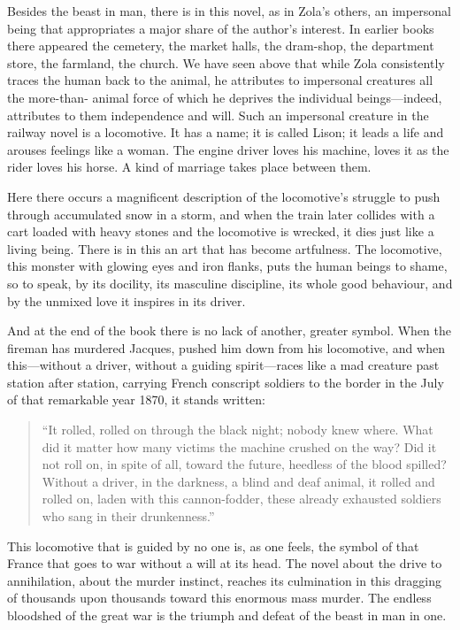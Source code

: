 \documentclass[12pt,a4paper]{article}
\begin{document}
Besides the beast in man, there is in this novel, as in Zola's others,
an impersonal being that appropriates a major share of the author's
interest. In earlier books there appeared the cemetery, the market
halls, the dram-shop, the department store, the farmland, the church.
We have seen above that while Zola consistently traces the human back
to the animal, he attributes to impersonal creatures all the more-than-
animal force of which he deprives the individual beings---indeed,
attributes to them independence and will. Such an impersonal creature
in the railway novel is a locomotive. It has a name; it is called
Lison; it leads a life and arouses feelings like a woman. The engine
driver loves his machine, loves it as the rider loves his horse. A
kind of marriage takes place between them.

Here there occurs a magnificent description of the locomotive's
struggle to push through accumulated snow in a storm, and when the
train later collides with a cart loaded with heavy stones and the
locomotive is wrecked, it dies just like a living being. There is in
this an art that has become artfulness. The locomotive, this monster
with glowing eyes and iron flanks, puts the human beings to shame, so
to speak, by its docility, its masculine discipline, its whole good
behaviour, and by the unmixed love it inspires in its driver.

And at the end of the book there is no lack of another, greater symbol.
When the fireman has murdered Jacques, pushed him down from his
locomotive, and when this---without a driver, without a guiding
spirit---races like a mad creature past station after station, carrying
French conscript soldiers to the border in the July of that remarkable
year 1870, it stands written:

\begin{quote}
``It rolled, rolled on through the black night; nobody knew where. What
did it matter how many victims the machine crushed on the way? Did it
not roll on, in spite of all, toward the future, heedless of the blood
spilled? Without a driver, in the darkness, a blind and deaf animal,
it rolled and rolled on, laden with this cannon-fodder, these already
exhausted soldiers who sang in their drunkenness.''
\end{quote}

This locomotive that is guided by no one is, as one feels, the symbol
of that France that goes to war without a will at its head. The novel
about the drive to annihilation, about the murder instinct, reaches
its culmination in this dragging of thousands upon thousands toward
this enormous mass murder. The endless bloodshed of the great war is
the triumph and defeat of the beast in man in one.
\end{document}
